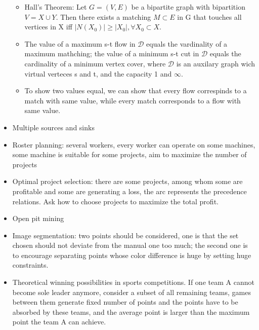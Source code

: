 \documentclass{article}
\begin{document}
\begin{itemize}
\begin{itemize}
\item Hall's Theorem: Let $G=(V,E)$ be a bipartite graph with bipartition $V=X\cup
 Y$. Then there exists a matching $M\subset E$ in G that touches all vertices in X iff $|N(X_0)|\geq |X_0|, \forall X_0\subset X$.
 \item The value of a maximum s-t flow in $\mathcal{D}$ equals the vardinality of a maximum mathching; the value of a minimum s-t cut in $\mathcal{D}$ equals the cardinality of a minimum vertex cover, where $\mathcal{D}$ is an auxilary graph wich virtual verteces s and t, and the capacity 1 and $\infty$.
 \item To show two values equal, we can show that every flow correspinds to a match with same value, while every match corresponds to a flow with same value.
\end{itemize}
\item Multiple sources and sinks
\item Roster planning: several workers, every worker can operate on some machines, some machine is suitable for some projects, aim to maximize the number of projects
\item Optimal project selection: there are some projects, among whom some are profitable and some are generating a loss, the arc represents the precedence relations. Ask how to choose projects to maximize the total profit.
\item Open pit mining
\item Image segmentation: two points should be considered, one is that the set chosen should not deviate from the manual one too much; the second one is to encourage separating points whose color difference is huge by setting huge constraints.
\item Theoretical winning possibilities in sports competitions. If one team A cannot become sole leader anymore, consider a subset of all remaining teams, games between them generate fixed number of points and the points have to be absorbed by these teams, and the average point is larger than the maximum point the team A can achieve.
\end{itemize}
\end{document}
